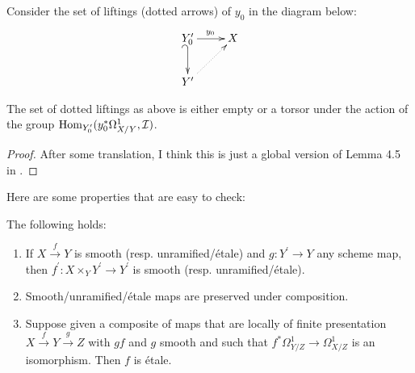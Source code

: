 \documentclass[11pt, english]{article}
\begin{document}
Consider the set of liftings (dotted arrows) of $y_0$ in the diagram below:
\[
\xymatrix{
Y_0^\prime \ar[r]^{y_0} \ar@{_(->}[d]&  X \\
 \ar@{.>}[ru]Y^\prime 
}
\]
\begin{prop}
\label{prop:liftings}
The set of dotted liftings as above is either empty or a torsor under the action of the group $\operatorname{Hom}_{Y_0^\prime}(y_0^\ast \Omega_{X/Y}^1, \mathcal I)$.
\end{prop}
\begin{proof}
After some translation, I think this is just a global version of Lemma 4.5 in \cite{hartshorne_def}.
\end{proof}

Here are some properties that are easy to check:

\begin{prop}
The following holds: 
\begin{enumerate}
\item
If $X \xrightarrow{f} Y$ is smooth (resp. unramified/étale) and $g:Y^\prime \to Y$ any scheme map, then $f^\prime: X \times_Y Y^\prime \to Y^\prime$ is smooth (resp. unramified/étale).
\item
Smooth/unramified/étale maps are preserved under composition.
\item
Suppose given a composite of maps that are locally of finite presentation $X \xrightarrow{f} Y \xrightarrow{g} Z$ with $gf$ and $g$ smooth and such that $f^\ast \Omega_{Y/Z}^1 \to \Omega_{X/Z}^1$ is an isomorphism. Then $f$ is étale. 
\end{enumerate}
\end{prop}
\end{document}
